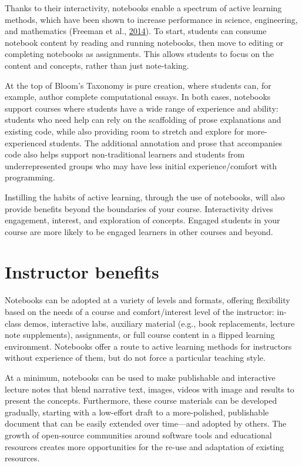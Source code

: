 \documentclass[]{book}
\begin{document}
Thanks to their interactivity, notebooks enable a spectrum of active
learning methods, which have been shown to increase performance in
science, engineering, and mathematics (Freeman et al.,
\protect\hyperlink{ref-freeman2014active}{2014}). To start, students can
consume notebook content by reading and running notebooks, then move to
editing or completing notebooks as assignments. This allows students to
focus on the content and concepts, rather than just note-taking.

At the top of Bloom's Taxonomy is pure creation, where students can, for
example, author complete computational essays. In both cases, notebooks
support courses where students have a wide range of experience and
ability: students who need help can rely on the scaffolding of prose
explanations and existing code, while also providing room to stretch and
explore for more-experienced students. The additional annotation and
prose that accompanies code also helps support non-traditional learners
and students from underrepresented groups who may have less initial
experience/comfort with programming.

Instilling the habits of active learning, through the use of notebooks,
will also provide benefits beyond the boundaries of your course.
Interactivity drives engagement, interest, and exploration of concepts.
Engaged students in your course are more likely to be engaged learners
in other courses and beyond.

\section{Instructor benefits}\label{instructor-benefits}

Notebooks can be adopted at a variety of levels and formats, offering
flexibility based on the needs of a course and comfort/interest level of
the instructor: in-class demos, interactive labs, auxiliary material
(e.g., book replacements, lecture note supplements), assignments, or
full course content in a flipped learning environment. Notebooks offer a
route to active learning methods for instructors without experience of
them, but do not force a particular teaching style.

At a minimum, notebooks can be used to make publishable and interactive
lecture notes that blend narrative text, images, videos with image and
results to present the concepts. Furthermore, these course materials can
be developed gradually, starting with a low-effort draft to a
more-polished, publishable document that can be easily extended over
time---and adopted by others. The growth of open-source communities
around software tools and educational resources creates more
opportunities for the re-use and adaptation of existing resources.
\end{document}
